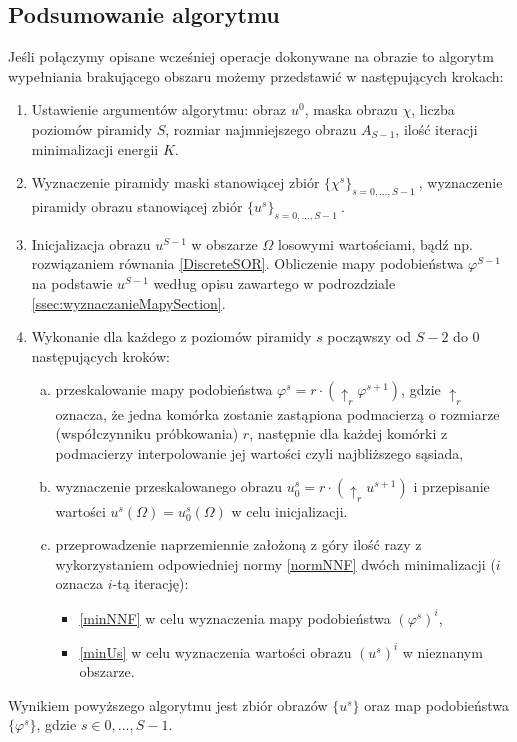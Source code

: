 \documentclass[a4paper,12pt,twoside,openany]{report}
\begin{document}
\subsection{Podsumowanie algorytmu}
\label{ssec:VFIPodsumowanie}
Jeśli połączymy opisane wcześniej operacje dokonywane na obrazie to algorytm wypełniania brakującego obszaru możemy przedstawić w następujących krokach:
\begin{enumerate}
\item
Ustawienie argumentów algorytmu: obraz $u^{0}$, maska obrazu $\chi$, liczba poziomów piramidy $S$, rozmiar najmniejszego obrazu $A_{S-1}$, ilość iteracji minimalizacji energii $K$.
\item
Wyznaczenie piramidy maski stanowiącej zbiór $\{\chi^s\}_{s=0,...,S-1} \ $, wyznaczenie piramidy obrazu stanowiącej zbiór $\{u^s\}_{s=0,...,S-1} \ $.
\item
Inicjalizacja obrazu $u^{S-1}$ w obszarze $\Omega$ losowymi wartościami, bądź np. rozwiązaniem równania \eqref{DiscreteSOR}. Obliczenie mapy podobieństwa $\varphi^{S-1}$ na podstawie $u^{S-1}$ według opisu zawartego w podrozdziale \ref{ssec:wyznaczanieMapySection}.
\item
Wykonanie dla każdego z poziomów piramidy $s$ począwszy od $S-2$ do $0$ następujących kroków:
\begin{enumerate}[a)]
\item
przeskalowanie mapy podobieństwa $\varphi^s=r \cdot (\uparrow_r \varphi^{s+1})$, gdzie $\uparrow_r$ oznacza, że jedna komórka zostanie zastąpiona podmacierzą o rozmiarze (współczynniku próbkowania) $r$, następnie dla każdej komórki z podmacierzy interpolowanie jej wartości czyli najbliższego sąsiada,
\item
wyznaczenie przeskalowanego obrazu $u^s_0=r \cdot (\uparrow_r u^{s+1})$ i przepisanie wartości $u^s(\Omega)=u^s_0(\Omega)$ w celu inicjalizacji.
\item
przeprowadzenie naprzemiennie założoną z góry ilość razy z wykorzystaniem odpowiedniej normy \eqref{normNNF} dwóch minimalizacji ($i$ oznacza $i$-tą iterację):
\begin{itemize}
\item
\eqref{minNNF} w celu wyznaczenia mapy podobieństwa ${\left(\varphi^s\right)}^i$,
\item
\eqref{minUs} w celu wyznaczenia wartości obrazu ${\left(u^s\right)}^i$ w nieznanym obszarze.
\end{itemize}
\end{enumerate}
\end{enumerate}
Wynikiem powyższego algorytmu jest zbiór obrazów $\{u^s\}$ oraz map podobieństwa $\{\varphi^s\}$, gdzie $s \in {0,...,S-1}$.
\end{document}
